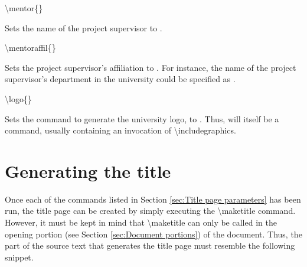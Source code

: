 \documentclass[twoside,openany]{thesis}
\begin{document}
\begin{listing}
\item   {\ttfamily\textbackslash mentor\{<mentor-name>\}}

        Sets the name of the project supervisor to {}.

\item   {\ttfamily\textbackslash mentoraffil\{<mentor-affiliation>\}}

        Sets the project supervisor's affiliation to {}.
        For instance, the name of the project supervisor's department in the university could be specified as {}.

\item   {\ttfamily\textbackslash logo\{<university-logo>\}}

        Sets the command to generate the university logo, to {}.
        Thus, {} will itself be a command, usually containing an invocation of {\ttfamily\textbackslash includegraphics}.

\end{listing}

\section{Generating the title}\label{sec:Generating the title}

Once each of the commands listed in Section \ref{sec:Title page parameters} has been run, the title page can be created by simply executing the {\ttfamily\textbackslash maketitle} command.
However, it must be kept in mind that {\ttfamily\textbackslash maketitle} can only be called in the opening portion (see Section \ref{sec:Document portions}) of the document.
Thus, the part of the source text that generates the title page must resemble the following snippet.
\end{document}

